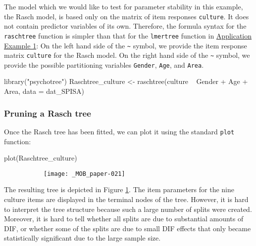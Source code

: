 \documentclass[doc,floatsintext,natbib]{apa7}
\begin{document}
The model which we would like to test for parameter stability in this example, the Rasch model, is based only on the matrix of item responses \texttt{culture}. It does not contain predictor variables of its own. Therefore, the formula syntax for the \texttt{raschtree} function is simpler than that for the \texttt{lmertree} function in \hyperref[sec:TutorialMixed]{Application Example 1}: On the left hand side of the \verb|~| symbol, we provide the item response matrix \texttt{culture} for the Rasch model. On the right hand side of the \verb|~| symbol, we provide the possible partitioning variables \texttt{Gender}, \texttt{Age}, and \texttt{Area}.



\begin{Schunk}
\begin{Sinput}
 library("psychotree")
 Raschtree_culture <- raschtree(culture ~  Gender + Age + Area,
                                data = dat_SPISA)
\end{Sinput}
\end{Schunk}

\subsubsection{Pruning a Rasch tree}

Once the Rasch tree has been fitted, we can plot it using the standard \texttt{plot} function: 

\begin{Schunk}
\begin{Sinput}
 plot(Raschtree_culture)
\end{Sinput}
\end{Schunk}

\begin{figure}%
\caption{Rasch tree fitted to the SPISA quiz items using the default stopping criterion based on statistical significance.}
\begin{subfigure}{1.2\textwidth}
\texttt{[image: \_MOB\_paper-021]}
\end{subfigure}
\label{fig:MHtree1}
\end{figure}%

The resulting tree is depicted in Figure \ref{fig:MHtree1}. The item parameters for the nine culture items are displayed in the terminal nodes of the tree. However, it is hard to interpret the tree structure because such a large number of splits were created. Moreover, it is hard to tell whether all splits are due to substantial amounts of DIF, or whether some of the splits are due to small DIF effects that only became statistically significant due to the large sample size.
\end{document}
